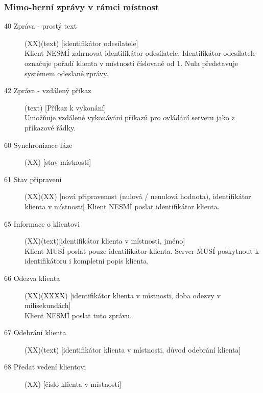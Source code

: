 \documentclass[12pt,a4paper]{article}
\begin{document}
\subsubsection*{Mimo-herní zprávy v rámci místnost}
\begin{description}
\item[40 Zpráva - prostý text](XX)(text) [identifikátor odesílatele] \\
Klient NESMÍ zahrnovat identifikátor odesílatele. Identifikátor odesílatele označuje pořadí klienta v místnosti číslovaně od 1. Nula představuje systémem odeslané zprávy.
\item[42 Zpráva - vzdálený příkaz](text) [Příkaz k vykonání] \\
Umožňuje vzdálené vykonávání příkazů pro ovládání serveru jako z příkazové řádky.

\item[60 Synchronizace fáze] (XX) [stav místnosti]

\item[61 Stav připravení] (XX)(XX) [nová připravenost (nulová / nenulová hodnota), identifikátor klienta v místnosti]
Klient NESMÍ poslat identifikátor klienta.

\item[65 Informace o klientovi] (XX)(text)[identifikátor klienta v místnosti, jméno] \\
Klient MUSÍ poslat pouze identifikátor klienta. Server MUSÍ poskytnout k identifikátoru i kompletní popis klienta.

\item[66 Odezva klienta] (XX)(XXXX) [identifikátor klienta v místnosti, doba odezvy v milisekundách] \\
Klient NESMÍ poslat tuto zprávu.

\item[67 Odebrání klienta] (XX)(text) [identifikátor klienta v místnosti, důvod odebrání klienta]

\item[68 Předat vedení klientovi] (XX) [číslo klienta v místnosti]
\end{description}
\end{document}

